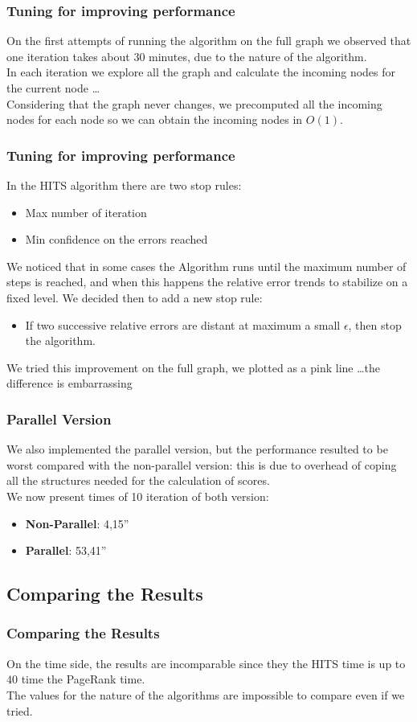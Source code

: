 \documentclass{beamer}
\begin{document}
\begin{frame}
\frametitle{Tuning for improving performance}
On the first attempts of running the algorithm on the full graph we observed that one iteration takes about 30 minutes, due to the nature of the algorithm. \\
In each iteration we explore all the graph and calculate the incoming nodes for the current node \dots\\
\bigskip
Considering that the graph never changes, we precomputed all the incoming nodes for each node so we can obtain the incoming nodes in $O(1)$.
\end{frame}

\begin{frame}
\frametitle{Tuning for improving performance}
In the HITS algorithm there are two stop rules:
\begin{itemize}
\item Max number of iteration
\item Min confidence on the errors reached
\end{itemize}
\medskip
We noticed that in some cases the Algorithm runs until the maximum number of steps is reached, and when this happens the relative error trends to stabilize on a fixed level. We decided then to add a new stop rule: \\
\begin{itemize}
\item If two successive relative errors are distant at maximum a small $\epsilon$, then stop the algorithm.
\end{itemize}
We tried this improvement on the full graph, we plotted as a pink line \dots the difference is embarrassing 
\end{frame}

\begin{frame}
\frametitle{Parallel Version}
We also implemented the parallel version, but the performance resulted to be worst compared with the non-parallel version: this is due to overhead of coping all the structures needed for the calculation of scores.\\
\medskip
We now present times of 10 iteration of both version:
\begin{itemize}
\item \textbf{Non-Parallel}: 4,15''
\item \textbf{Parallel}: 53,41''
\end{itemize} 
\end{frame}

\subsection{Comparing the Results}
\begin{frame}
\frametitle{Comparing the Results}
On the time side, the results are incomparable since they the HITS time is up to $40$ time the PageRank time.\\
\medskip
The values for the nature of the algorithms are impossible to compare even if we tried.
\end{frame}
\end{document}
